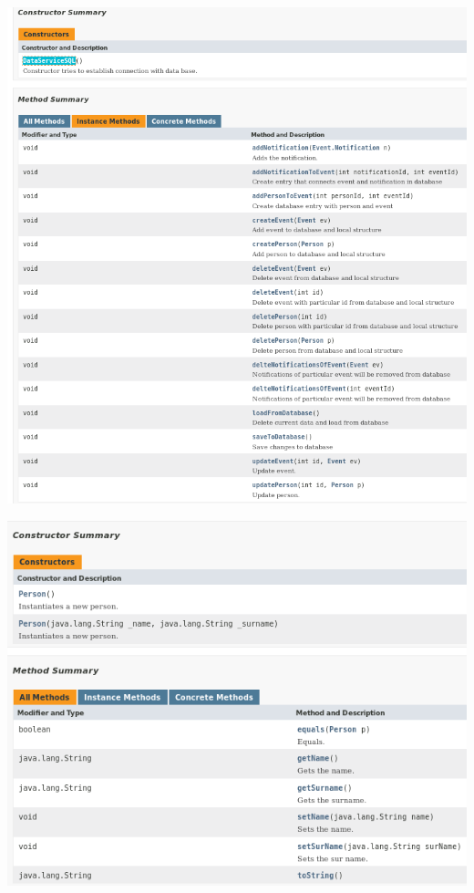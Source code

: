 \documentclass[a4paper,12pt]{article}
\begin{document}
\begin{minipage}{\textwidth}

    \includegraphics[width=\textwidth]{./screen/dataLayer/DataServiceSQL.png}
    \label{DataServiceSQL}

\end{minipage}

\begin{minipage}{\textwidth}

    \includegraphics[width=\textwidth]{./screen/dataLayer/Person.png}
    \label{Person}

\end{minipage}
\end{document}
